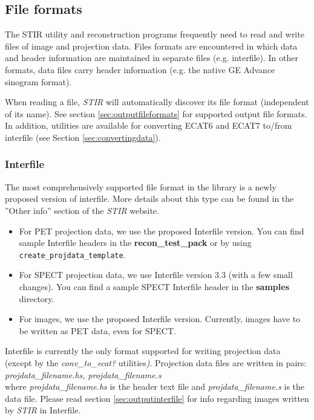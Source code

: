 \documentclass{article}
\begin{document}
\subsection{
File formats}

The STIR utility and reconstruction programs frequently need 
to read and write files of image and projection data. Files formats 
are encountered in which data and header information are maintained 
in separate files (e.g. interfile). In other formats, data files 
carry header information (e.g. the native GE Advance sinogram 
format).

When reading a file, \textit{STIR} will automatically discover its file format
(independent of its name). See section \ref{sec:outputfileformats} for supported output file formats. In addition, 
utilities are available for converting ECAT6 and ECAT7 to/from 
interfile (see Section \ref{sec:convertingdata}). 

\subsubsection{Interfile}

The most comprehensively supported file format in the library 
is a newly proposed version of interfile. More details about 
this type can be found in the ''Other info'' section of the \textit{STIR} website.

\begin{itemize}
\item For PET projection data, we use the proposed Interfile version. You can
find sample Interfile headers in the \textbf{recon\_test\_pack} or by using
\texttt{create\_projdata\_template}.

\item For SPECT projection data, we use Interfile version 3.3 (with a few small changes).
You can find a sample SPECT Interfile header in the \textbf{samples} directory.

\item For images, we use the proposed Interfile version. Currently, images have to 
be written as PET data, even for SPECT.
\end{itemize}

Interfile is currently the only format supported for writing projection 
data (except by the \textit{conv\_to\_ecat?} utilities\textit{)}. Projection 
data files are written in pairs:\\
\textit{projdata\_filename.hs, 
projdata\_filename.s}\\
where \textit{projdata\_filename.hs} is the header text file and \textit{projdata\_filename.s} 
is the data file. Please read section \ref{sec:outputinterfile} for info regarding 
images written by \textit{STIR} in Interfile.
\end{document}
